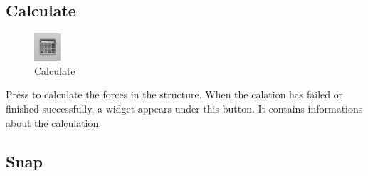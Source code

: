 \documentclass[a4paper,11pt]{report}
\begin{document}
\subsection{Calculate}

\begin{minipage}[h]{4cm}
\begin{figure}[H]
\begin{center}
\includegraphics[scale=0.6]{./pictures/calctoolbar.png}
\caption{Calculate}
\label{pic:calctoolbar}
\end{center}
\end{figure}
\end{minipage}
\begin{minipage}[h]{\textwidth-4cm}
Press to calculate the forces in the structure. When the calation has failed or finished successfully, a widget appears under this button. It contains informations about the calculation.
\end{minipage}

\subsection{Snap}
\end{document}
